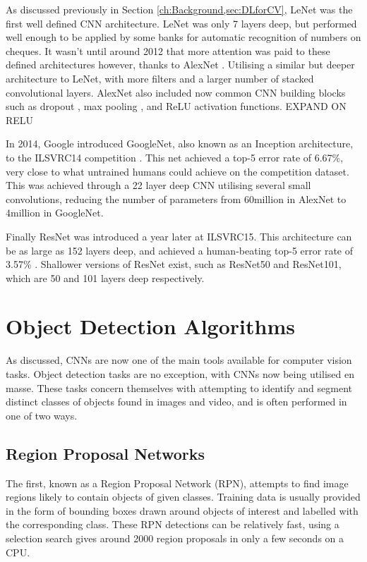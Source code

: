 As discussed previously in Section \ref{ch:Background,sec:DLforCV}, LeNet \cite{lecun_gradient-based_1998} was the first well defined CNN architecture. LeNet was only 7 layers deep, but performed well enough to be applied by some banks for automatic recognition of numbers on cheques. It wasn't until around 2012 that more attention was paid to these defined architectures however, thanks to AlexNet \cite{krizhevsky_imagenet_2012}. Utilising a similar but deeper architecture to LeNet, with more filters and a larger number of stacked convolutional layers. AlexNet also included now common CNN building blocks such as dropout \cite{srivastava_dropout:_2014}, max pooling \cite{boureau_theoretical_2010}, and ReLU activation functions. EXPAND ON RELU

 In 2014, Google introduced GoogleNet, also known as an Inception architecture, to the ILSVRC14 competition \cite{szegedy_going_2015}. This net achieved a top-5 error rate of 6.67\%, very close to what untrained humans could achieve on the competition dataset. This was achieved through a 22 layer deep CNN utilising several small convolutions, reducing the number of parameters from 60million in AlexNet to 4million in GoogleNet. 

Finally ResNet was introduced a year later at ILSVRC15. This architecture can be as large as 152 layers deep, and achieved a human-beating top-5 error rate of 3.57\% \cite{he_deep_2015}. Shallower versions of ResNet exist, such as ResNet50 and ResNet101, which are 50 and 101 layers deep respectively. 

\section{Object Detection Algorithms}\label{ch:Background,sec:objectDetection}
As discussed, CNNs are now one of the main tools available for computer vision tasks. Object detection tasks are no exception, with CNNs now being utilised en masse. These tasks concern themselves with attempting to identify and segment distinct classes of objects found in images and video, and is often performed in one of two ways. 

\subsection{Region Proposal Networks}\label{ch:Background,sec:objectDetection,sub:RPN}
The first, known as a Region Proposal Network (RPN), attempts to find image regions likely to contain objects of given classes. Training data is usually provided in the form of bounding boxes drawn around objects of interest and labelled with the corresponding class. These RPN detections can be relatively fast, using a selection search \cite{uijlings_selective_2013} gives around 2000 region proposals in only a few seconds on a CPU.

